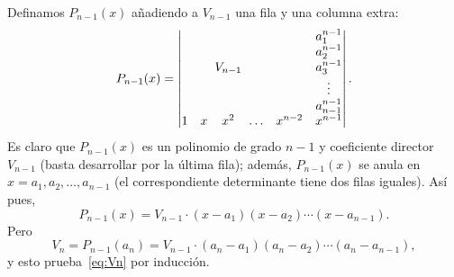 \documentclass[autocontact]{gaceta}
\begin{document}
Definamos $P_{n-1}(x)$ añadiendo a $V_{n-1}$ una fila y una columna extra:
\[
  P_{n-1}(x) = 
  \begin{vmatrix}
   &  &  &  &  &            a_{1}^{n-1} \\ 
   &  &  &  &  &            a_{2}^{n-1} \\ 
   &  & \hspace{-1ex}V_{n-1}\hspace{-1ex} &  &  &     a_{3}^{n-1} \\ 
   &  &  &  &  &            \vdots \\ 
   &  &  &  &  &            a_{n-1}^{n-1} \\ 
  1 & x & x^{2} & \ldots &  x^{n-2} & x^{n-1} 
  \end{vmatrix}.
\]
Es claro que $P_{n-1}(x)$ es un polinomio de grado $n-1$ y coeficiente director $V_{n-1}$ (basta desarrollar por la última fila);
además, $P_{n-1}(x)$ se anula en $x = a_1,a_2,\ldots,a_{n-1}$ (el correspondiente determinante tiene dos filas iguales).
Así pues,
\[
  P_{n-1}(x) = V_{n-1} \cdot (x-a_1)(x-a_2) \cdots (x-a_{n-1}).
\]
Pero
\[
  V_n = P_{n-1}(a_n) = V_{n-1} \cdot (a_n-a_1)(a_n-a_2) \cdots (a_n-a_{n-1}),
\]
y esto prueba~\eqref{eq:Vn} por inducción.

\enlargethispage{2mm}

\medskip

\end{document}
